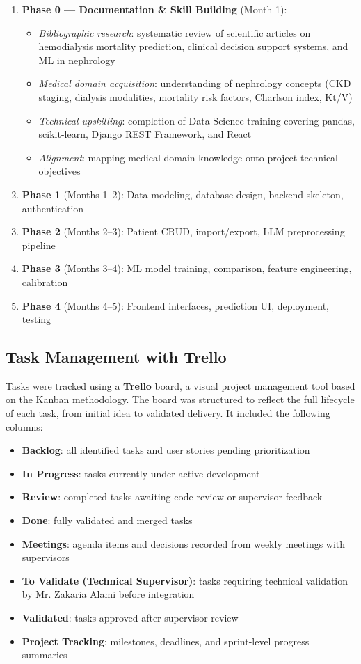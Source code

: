 \documentclass[12pt,a4paper,twoside]{report}
\begin{document}
\begin{enumerate}
  \item \textbf{Phase 0 — Documentation \& Skill Building} (Month 1):
  \begin{itemize}
    \item \textit{Bibliographic research}: systematic review of scientific articles on hemodialysis mortality prediction, clinical decision support systems, and ML in nephrology
    \item \textit{Medical domain acquisition}: understanding of nephrology concepts (CKD staging, dialysis modalities, mortality risk factors, Charlson index, Kt/V)
    \item \textit{Technical upskilling}: completion of Data Science training covering pandas, scikit-learn, Django REST Framework, and React
    \item \textit{Alignment}: mapping medical domain knowledge onto project technical objectives
  \end{itemize}
  \item \textbf{Phase 1} (Months 1--2): Data modeling, database design, backend skeleton, authentication
  \item \textbf{Phase 2} (Months 2--3): Patient CRUD, import/export, LLM preprocessing pipeline
  \item \textbf{Phase 3} (Months 3--4): ML model training, comparison, feature engineering, calibration
  \item \textbf{Phase 4} (Months 4--5): Frontend interfaces, prediction UI, deployment, testing
\end{enumerate}

\subsection{Task Management with Trello}

Tasks were tracked using a \textbf{Trello} board, a visual project management tool based on the Kanban methodology. The board was structured to reflect the full lifecycle of each task, from initial idea to validated delivery. It included the following columns:

\begin{itemize}
  \item \textbf{Backlog}: all identified tasks and user stories pending prioritization
  \item \textbf{In Progress}: tasks currently under active development
  \item \textbf{Review}: completed tasks awaiting code review or supervisor feedback
  \item \textbf{Done}: fully validated and merged tasks
  \item \textbf{Meetings}: agenda items and decisions recorded from weekly meetings with supervisors
  \item \textbf{To Validate (Technical Supervisor)}: tasks requiring technical validation by Mr. Zakaria Alami before integration
  \item \textbf{Validated}: tasks approved after supervisor review
  \item \textbf{Project Tracking}: milestones, deadlines, and sprint-level progress summaries
\end{itemize}
\end{document}
